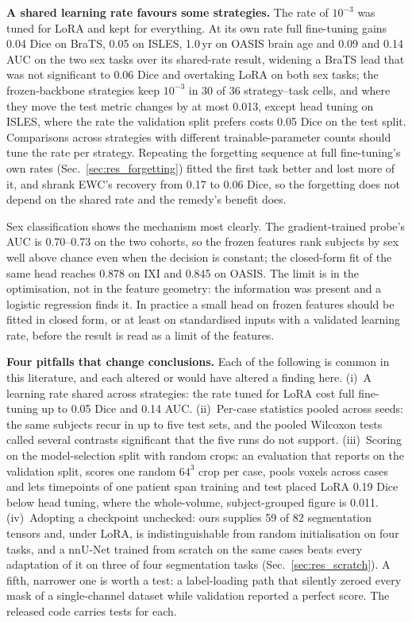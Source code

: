 \iffull\documentclass[journal]{IEEEtran}\else\documentclass[journal,twoside,web]{ieeecolor}\usepackage{generic}\fi
\begin{document}
\textbf{A shared learning rate favours some strategies.} The rate of $10^{-3}$ was tuned for LoRA and kept for everything. At its own rate full fine-tuning gains 0.04 Dice on BraTS, 0.05 on ISLES, 1.0\,yr on OASIS brain age and 0.09 and 0.14 AUC on the two sex tasks over its shared-rate result, widening a BraTS lead that was not significant to 0.06 Dice and overtaking LoRA on both sex tasks; the frozen-backbone strategies keep $10^{-3}$ in 30 of 36 strategy--task cells, and where they move the test metric changes by at most 0.013, except head tuning on ISLES, where the rate the validation split prefers costs 0.05 Dice on the test split. Comparisons across strategies with different trainable-parameter counts should tune the rate per strategy. Repeating the forgetting sequence at full fine-tuning's own rates (Sec.~\ref{sec:res_forgetting}) fitted the first task better and lost more of it, and shrank EWC's recovery from 0.17 to 0.06 Dice, so the forgetting does not depend on the shared rate and the remedy's benefit does.

\iffull  %
Sex classification shows the mechanism most clearly. The gradient-trained probe's AUC is 0.70--0.73 on the two cohorts, so the frozen features rank subjects by sex well above chance even when the decision is constant; the closed-form fit of the same head reaches 0.878 on IXI and 0.845 on OASIS. The limit is in the optimisation, not in the feature geometry: the information was present and a logistic regression finds it. In practice a small head on frozen features should be fitted in closed form, or at least on standardised inputs with a validated learning rate, before the result is read as a limit of the features.
\fi  %

\textbf{Four pitfalls that change conclusions.} Each of the following is common in this literature, and each altered or would have altered a finding here. (i)~A learning rate shared across strategies: the rate tuned for LoRA cost full fine-tuning up to 0.05 Dice and 0.14 AUC. (ii)~Per-case statistics pooled across seeds: the same subjects recur in up to five test sets, and the pooled Wilcoxon tests called several contrasts significant that the five runs do not support. (iii)~Scoring on the model-selection split with random crops: an evaluation that reports on the validation split, scores one random $64^3$ crop per case, pools voxels across cases and lets timepoints of one patient span training and test placed LoRA 0.19 Dice below head tuning, where the whole-volume, subject-grouped figure is 0.011. (iv)~Adopting a checkpoint unchecked: ours supplies 59 of 82 segmentation tensors and, under LoRA, is indistinguishable from random initialisation on four tasks, and a nnU-Net trained from scratch on the same cases beats every adaptation of it on three of four segmentation tasks (Sec.~\ref{sec:res_scratch}). A fifth, narrower one is worth a test: a label-loading path that silently zeroed every mask of a single-channel dataset while validation reported a perfect score. The released code carries tests for each.
\end{document}
